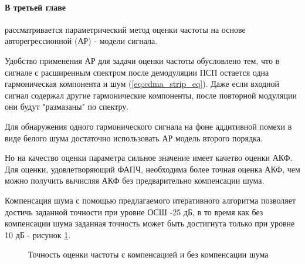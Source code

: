 \paragraph{В третьей главе} рассматривается параметрический метод оценки частоты на основе авторегрессионной (АР) - модели сигнала.

Удобство применения АР для задачи оценки частоты обусловлено тем, что в сигнале с расширенным спектром после демодуляции ПСП остается одна
гармоническая компонента и шум (\ref{eq:cdma_strip_eq}).  Даже если входной сигнал содержал другие гармонические компоненты,
после повторной модуляции они будут "размазаны" по спектру.

Для обнаружения одного гармонического сигнала на фоне аддитивной помехи в виде белого шума достаточно использовать АР модель второго порядка.

Но на качество оценки параметра сильное значение имеет качетво оценки АКФ. Для оценки, удовлетворяющий ФАПЧ, необходима более точная
оценка АКФ, чем можно получить вычисляя АКФ без предварительно компенсации шума.

Компенсация шума с помощью предлагаемого итеративного алгоритма позволяет достичь заданной точности при уровне ОСШ -25 дБ, в то
время как без компенсации шума заданная точность может быть достигнута только при уровне 10 дБ - рисунок \ref{pic:ACF_boost}.

\begin{figure}[H]
\center{}
	\caption{Точность оценки частоты с компенсацией и без компенсации шума}
	\label{pic:ACF_boost}
\end{figure}
